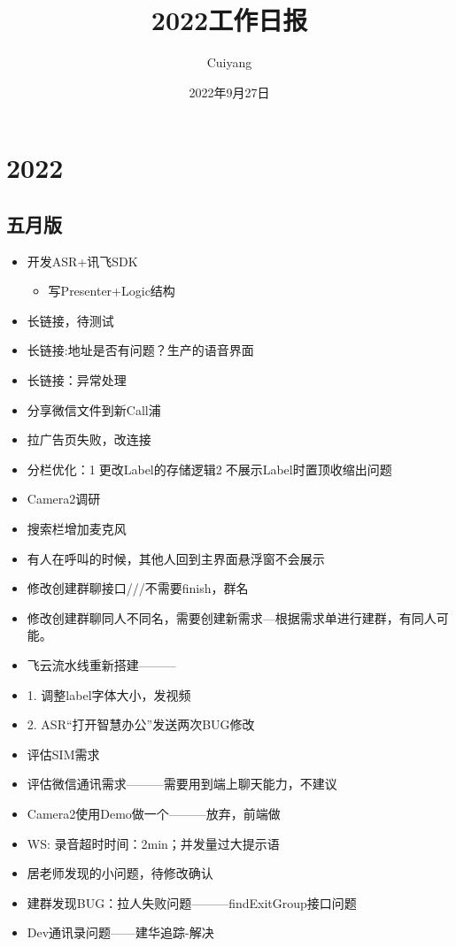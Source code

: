 \documentclass{ctexart}
\title{\heiti 2022工作日报}
\author{Cuiyang}
\date{\kaishu 2022年9月27日}
\begin{document}
	\maketitle
	\section{2022}
	\subsection{五月版}
	\begin{itemize}
		\item 开发ASR+讯飞SDK
		\begin{itemize}
			\item 写Presenter+Logic结构
		\end{itemize}
		\item 长链接，待测试
		\item 长链接:地址是否有问题？生产的语音界面
		\item 长链接：异常处理
		\item 分享微信文件到新Call浦
		\item 拉广告页失败，改连接
		\item 分栏优化：1⃣️更改Label的存储逻辑2⃣️不展示Label时置顶收缩出问题
		\item Camera2调研
		\item 搜索栏增加麦克风
		\item 有人在呼叫的时候，其他人回到主界面悬浮窗不会展示
		\item 修改创建群聊接口///不需要finish，群名
		\item 修改创建群聊同人不同名，需要创建新需求—根据需求单进行建群，有同人可能。
		\item 飞云流水线重新搭建———
		
		\item 1. 调整label字体大小，发视频
		\item 2. ASR“打开智慧办公”发送两次BUG修改
		\item 评估SIM需求
		\item 评估微信通讯需求———需要用到端上聊天能力，不建议
		\item Camera2使用Demo做一个———放弃，前端做
		\item WS: 录音超时时间：2min；并发量过大提示语
		\item 居老师发现的小问题，待修改确认
		\item 建群发现BUG：拉人失败问题———findExitGroup接口问题
		\item Dev通讯录问题——建华追踪-解决
		
	\end{itemize}
\end{document}

